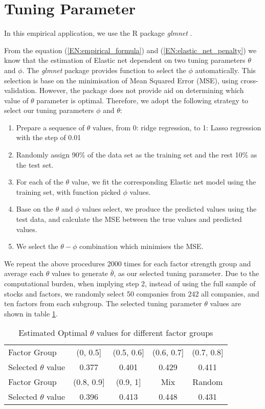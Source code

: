 \section{Tuning Parameter} \label{EN:parameter_tuning }
In this empirical application, we use the R package \textit{glmnet} \cite{Friedman2010, Simon2011}.

From the equation (\ref{EN:empirical_formula}) and (\ref{EN:elastic_net_penalty}) we know that the estimation of Elastic net dependent on two tuning parameters $\theta$ and $\phi$.
The \textit{glmnet} package provides function to select the $\phi$ automatically. 
This selection is base on the minimisation of Mean Squared Error (MSE), using cross-validation.
However, the package does not provide aid on determining which value of $\theta$ parameter is optimal.
Therefore, we adopt the following strategy to select our tuning parameters $\phi$  and $\theta$:
\begin{enumerate}
\item Prepare a sequence of $\theta$ values, from 0: ridge regression, to 1: Lasso regression with the step of 0.01
\item Randomly assign 90\% of the data set as the training set and the rest 10\% as the test set. 
\item For each of the $\theta$ value, we fit the corresponding Elastic net model using the training set, with function picked $\phi$ values.
\item Base on the $\theta$ and $\phi$ values select, we produce the predicted values using the test data, and calculate the MSE between the true values and predicted values.
\item We select the $\theta - \phi$ combination which minimises the MSE.
\end{enumerate}
We repeat the above procedures 2000 times for each factor strength group and average each $\theta$ values to generate $\bar{\theta}$, as our selected tuning parameter.
Due to the computational burden, when implying step 2, instead of using the full sample of stocks and factors, we randomly select 50 companies from 242 all companies, and ten factors from each subgroup.
The selected tuning parameter $\theta$ values are shown in table \ref{table:optimal_theta}.
\begin{table}[]
	\centering
	\caption{Estimated Optimal $\theta$ values for different factor groups}
	\label{table:optimal_theta}
	\begin{tabular}{l|cccc}
		\hline
		\hline
		Factor Group            & (0, 0.5{]}   & (0.5, 0.6{]} & (0.6, 0.7{]} & (0.7, 0.8{]} \\ 
		Selected $\theta$ value & 0.377        & 0.401        & 0.429        & 0.411        \\ \hline
		Factor Group            & (0.8, 0.9{]} & (0.9, 1{]}   & Mix          & Random       \\ 
		Selected $\theta$ value & 0.396        & 0.413        & 0.448        & 0.431        \\ \hline
		\hline
	\end{tabular}
\end{table}
